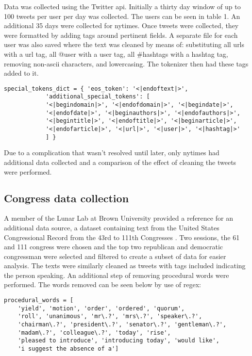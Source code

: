 \documentclass[11pt]{article}
\begin{document}
Data was collected using the Twitter api. Initially a thirty day window of up to 100 tweets per user
per day was collected. The users can be seen in table 1. An additional 35 days were collected for nytimes.
Once tweets were collected, they were formatted by adding tags around pertinent fields. A separate file
for each user was also saved where the text was cleaned by means of: substituting all urls with a url tag,
all @user with a user tag, all \#hashtags with a hashtag tag, removing non-ascii characters, and lowercasing. 
The tokenizer then had these tags added to it.

\begin{verbatim}
special_tokens_dict = { 'eos_token': '<|endoftext|>',
			'additional_special_tokens': [
			'<|begindomain|>', '<|endofdomain|>', '<|begindate|>', 
			'<|endofdate|>', '<|beginauthors|>', '<|endofauthors|>',
			'<|begintitle|>', '<|endoftitle|>', '<|beginarticle|>', 
			'<|endofarticle|>', '<|url|>', '<|user|>', '<|hashtag|>'
			] }
\end{verbatim}


Due to a complication that wasn't resolved until later, only nytimes had additional data collected and a 
comparison of the effect of cleaning the tweets were performed.

\subsection{Congress data collection}
\label{sec:orga0a7497}

A member of the Lunar Lab at Brown University provided a reference for an additional data source,
a dataset containing text from the United States Congressional Record from the 43rd to 111th Congresses 
\cite{congress_text}. Two sessions, the 61 and 111 congress were chosen and the top two republican and
democratic congressman were selected and filtered to create a subset of data for easier analysis. The
texts were similarly cleaned as tweets with tags included indicating the person speaking. An additional
step of removing procedural words were performed. The words removed  can be seen below by use of regex:

\begin{verbatim}
procedural_words = [
    'yield', 'motion', 'order', 'ordered', 'quorum', 
    'roll', 'unanimous', 'mr\.?', 'mrs\.?', 'speaker\.?', 
    'chairman\.?', 'president\.?', 'senator\.?', 'gentleman\.?', 
    'madam\.?', 'colleague\.?', 'today', 'rise', 
    'pleased to introduce', 'introducing today', 'would like',
    'i suggest the absence of a']
\end{verbatim}
\end{document}
